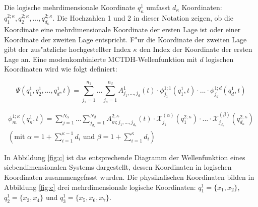 Die logische mehrdimensionale Koordinate $ q^1_\kappa $ umfasst $d_\kappa $ Koordinaten:  $q^{2;\kappa}_1, q^{2;\kappa}_2, ..., q^{2;\kappa}_{d_\kappa} $.
Die Hochzahlen 1 und 2 in dieser Notation zeigen, ob die Koordinate eine mehrdimensionale Koordinate der ersten Lage ist oder einer Koordinate
der zweiten Lage entspricht. F"ur die Koordinate der zweiten Lage gibt der zus"atzliche hochgestellter Index $\kappa$
den Index der Koordinate der ersten Lage an.
Eine modenkombinierte MCTDH-Wellenfunktion mit $d$ logischen Koordinaten wird wie folgt definiert:

\begin{equation}
 \Psi(q^{1}_{1},q^{1}_{2},..., q^{1}_{d}, t)=\sum^{n_{1}}_{j_{1}=1} ... \sum^{n_{d}}_{j_{d}=1} A^{1}_{j_{1}, ..., j_{d}}(t)
 \cdot \phi^{1;1}_{j_{1}}(q^1_{1}, t) \cdot ... \cdot \phi^{1;d}_{j_{d}}(q^1_{d}, t)
 \label{Eq:mode_comb_wave}
 \end{equation}

\begin{equation}
  \begin{gathered}
 \phi^{1;\kappa}_{m} (q^1_{\kappa}, t)=\sum^{N_{\alpha}}_{j=1} ... \sum^{N_{\beta}}_{j_{d_\kappa}=1} A^{2;\kappa}_{m;j_1,...,j_{d_\kappa}}(t)
 \cdot \mathcal{X}^{(\alpha)}_{j_1}(q^{2;\kappa}_1) \cdot ... \cdot
 \mathcal{X}^{(\beta)}_{j_{d_\kappa}}(q^{2;\kappa}_{d_\kappa})\\
 \left(\text{mit } \alpha = 1 + \sum^{\kappa - 1}_{i=1}d_i \text{ und }  \beta = 1 + \sum^{\kappa}_{i=1}d_i\right)
 \label{Eq:mode_SPF}
\end{gathered}
 \end{equation}

In Abbildung \ref{fig:c} ist das entsprechende Diagramm der Wellenfunktion eines siebendimensionalen Systems dargestellt, dessen Koordinaten 
in logischen Koordinaten zusammengefasst wurden.
Die physikalischen Koordinaten bilden in Abbildung \ref{fig:c} drei mehrdimensionale logische Koordinaten:
 $q^{1}_{1} = \{x_1, x_2\}$, $ q^{1}_{2} = \{x_3, x_4\}$
und $ q^{1}_{3} = \{x_5, x_6, x_7\}$.


